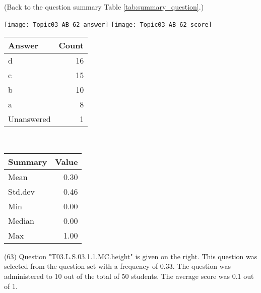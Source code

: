 \documentclass[12pt,english,nohyper]{tufte-handout}\usepackage[]{graphicx}\usepackage[]{color}
\begin{document}
 (Back to the question summary Table \ref{tab:summary_question}.)

\begin{center} \texttt{[image: Topic03\_AB\_62\_answer]} \texttt{[image: Topic03\_AB\_62\_score]} \end{center} 

\begin{center}%
\begin{tabular}{lr}
  \hline
Answer & Count \\ 
  \hline
d &  16 \\ 
  c &  15 \\ 
  b &  10 \\ 
  a &   8 \\ 
  Unanswered &   1 \\ 
   \hline
\end{tabular}
~~~~~~~~%
\begin{tabular}{lr}
  \hline
Summary & Value \\ 
  \hline
Mean & 0.30 \\ 
  Std.dev & 0.46 \\ 
  Min & 0.00 \\ 
  Median & 0.00 \\ 
  Max & 1.00 \\ 
   \hline
\end{tabular}
\end{center}\newpage{} (63) Question "T03.L.S.03.1.1.MC.height" is given on the right. This question was selected from the question set with a frequency of 0.33. The question was administered to 10 out of the total of 50 students. The average score was 0.1 out of 1.
\end{document}
